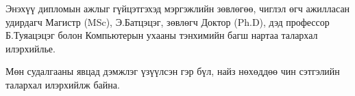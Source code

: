 
\begin{acknowledgements}
\addchaptertocentry{\acknowledgementname}

Энэхүү дипломын ажлыг гүйцэтгэхэд мэргэжлийн зөвлөгөө, чиглэл өгч ажилласан удирдагч Магистр (MSc), Э.Батцэцэг, зөвлөгч Доктор (Ph.D), дэд профессор Б.Туяацэцэг болон Компьютерын ухааны тэнхимийн багш нартаа талархал илэрхийлье.

Мөн судалгааны явцад дэмжлэг үзүүлсэн гэр бүл, найз нөхөддөө чин сэтгэлийн талархал илэрхийлж байна.

\end{acknowledgements}
